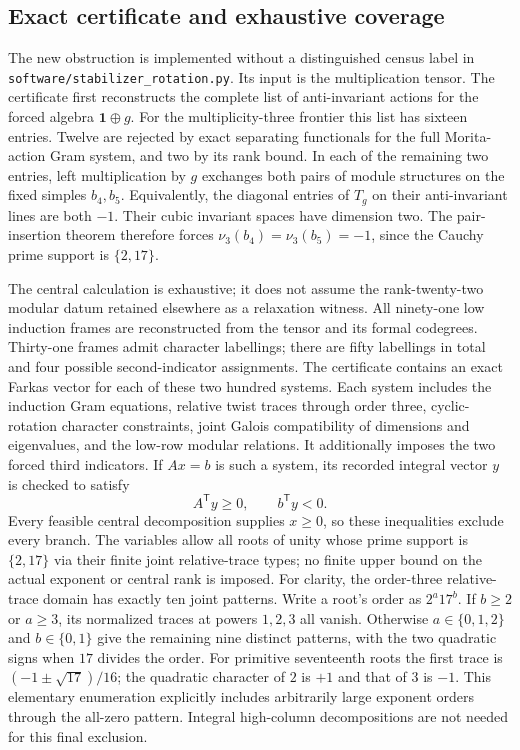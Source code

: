 \subsection{Exact certificate and exhaustive coverage}
\label{subsec:stabilizer-rotation-certificate}
The new obstruction is implemented without a distinguished census label in
\texttt{software/stabilizer\_rotation.py}.  Its input is the multiplication
tensor.  The certificate first reconstructs the complete list of
anti-invariant actions for the forced algebra $\mathbf1\oplus g$.
For the multiplicity-three frontier this list has sixteen entries.  Twelve
are rejected by exact separating functionals for the full Morita-action Gram
system, and two by its rank bound.  In each of the remaining two entries,
left multiplication by $g$ exchanges both pairs of module structures on the
fixed simples $b_4,b_5$.  Equivalently, the diagonal entries of $T_g$ on their
anti-invariant lines are both $-1$.  Their cubic invariant spaces have
 dimension two.  The pair-insertion theorem therefore forces
$\nu_3(b_4)=\nu_3(b_5)=-1$, since the Cauchy prime support is $\{2,17\}$.

The central calculation is exhaustive; it does not assume the rank-twenty-two
modular datum retained elsewhere as a relaxation witness.  All ninety-one
low induction frames are reconstructed from the tensor and its formal
codegrees.  Thirty-one frames admit character labellings; there are fifty
labellings in total and four possible second-indicator assignments.  The
certificate contains an exact Farkas vector for each of these two hundred
systems.  Each system includes the induction Gram equations, relative twist
traces through order three, cyclic-rotation character constraints, joint
Galois compatibility of dimensions and eigenvalues, and the low-row modular
relations.  It additionally imposes the two forced third indicators.  If
$Ax=b$ is such a system, its recorded integral vector $y$ is checked to satisfy
\[
 A^{\mathsf T}y\geq0,\qquad b^{\mathsf T}y<0.
\]
Every feasible central decomposition supplies $x\geq0$, so these inequalities
exclude every branch.  The variables allow all roots of unity whose prime
support is $\{2,17\}$ via their finite joint relative-trace types; no finite
upper bound on the actual exponent or central rank is imposed.  For clarity, the order-three relative-trace domain has exactly ten joint
patterns.  Write a root's order as $2^a17^b$.  If $b\geq2$ or $a\geq3$,
its normalized traces at powers $1,2,3$ all vanish.  Otherwise
$a\in\{0,1,2\}$ and $b\in\{0,1\}$ give the remaining nine distinct
patterns, with the two quadratic signs when $17$ divides the order.
For primitive seventeenth roots the first trace is
$(-1\pm\sqrt{17})/16$; the quadratic character of $2$ is $+1$ and
that of $3$ is $-1$.  This elementary enumeration explicitly includes
arbitrarily large exponent orders through the all-zero pattern.
Integral high-column decompositions are not needed for this final exclusion.

